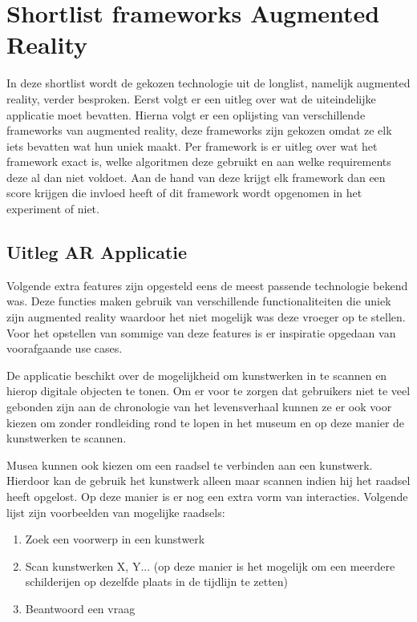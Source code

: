 \chapter{Shortlist frameworks Augmented Reality}
\label{ch:shortlist}

In deze shortlist wordt de gekozen technologie uit de longlist, namelijk augmented reality, verder besproken.
Eerst volgt er een uitleg over wat de uiteindelijke applicatie moet bevatten.
Hierna volgt er een oplijsting van verschillende frameworks van augmented reality, deze frameworks zijn gekozen omdat ze elk iets bevatten wat hun uniek maakt. Per framework is er uitleg over wat het framework exact is, welke algoritmen deze gebruikt en aan welke requirements deze al dan niet voldoet. Aan de hand van deze krijgt elk framework dan een score krijgen die invloed heeft of dit framework wordt opgenomen in het experiment of niet.

\section{Uitleg AR Applicatie}\label{sec:arrequirements}
Volgende extra features zijn opgesteld eens de meest passende technologie bekend was. Deze functies maken gebruik van verschillende functionaliteiten die uniek zijn augmented reality waardoor het niet mogelijk was deze vroeger op te stellen.  Voor het opstellen van sommige van deze features is er inspiratie opgedaan van voorafgaande use cases.

De applicatie beschikt over de mogelijkheid om kunstwerken in te scannen en hierop digitale objecten te tonen. 
Om er voor te zorgen dat gebruikers niet te veel gebonden zijn aan de chronologie van het levensverhaal kunnen ze er ook voor kiezen om zonder rondleiding rond te lopen in het museum en op deze manier de kunstwerken te scannen.

Musea kunnen ook kiezen om een raadsel te verbinden aan een kunstwerk. Hierdoor kan de gebruik het kunstwerk alleen maar scannen indien hij het raadsel heeft opgelost. Op deze manier is er nog een extra vorm van interacties. Volgende lijst zijn voorbeelden van mogelijke raadsels: 

\begin{enumerate}
    \item Zoek een voorwerp in een kunstwerk
    \item Scan kunstwerken X, Y... (op deze manier is het mogelijk om een meerdere schilderijen op dezelfde plaats in de tijdlijn te zetten)
    \item Beantwoord een vraag
\end{enumerate}

